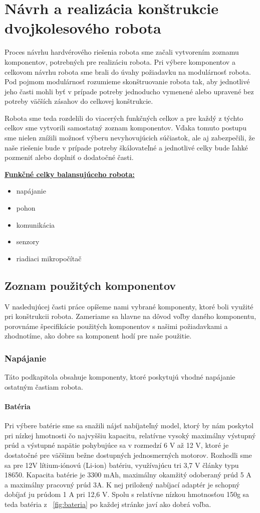 \chapter{Návrh a realizácia konštrukcie dvojkolesového robota}

Proces návrhu hardvérového riešenia robota sme začali vytvorením zoznamu komponentov, potrebných pre realizáciu robota. Pri výbere komponentov a celkovom návrhu robota sme brali do úvahy požiadavku na modulárnosť robota. Pod pojmom modulárnosť rozumieme skonštruovanie robota tak, aby jednotlivé jeho časti mohli byť v prípade potreby jednoducho vymenené alebo upravené bez potreby väčších zásahov do celkovej konštrukcie. 

Robota sme teda rozdelili do viacerých funkčných celkov a pre každý z týchto celkov sme vytvorili samostatný zoznam komponentov. Vďaka tomuto postupu sme nielen znížili možnosť výberu nevyhovujúcich súčiastok, ale aj zabezpečili, že naše riešenie bude v prípade potreby škálovateľné a jednotlivé celky bude ľahké pozmeniť alebo doplniť o dodatočné časti. 


\underline{\textbf{Funkčné celky balansujúceho robota:}}
\begin{itemize}
\item napájanie
\item pohon
\item komunikácia
\item senzory
\item riadiaci mikropočítač
\end{itemize}

\section{Zoznam použitých komponentov}

V nasledujúcej časti práce opíšeme nami vybrané komponenty, ktoré boli využité pri konštrukcii robota. Zameriame sa hlavne na dôvod voľby daného komponentu, porovnáme špecifikácie použitých komponentov s našimi požiadavkami a zhodnotíme, ako dobre sa komponent hodí pre naše použitie.


\subsection{Napájanie}
Táto podkapitola obsahuje komponenty, ktoré poskytujú vhodné napájanie ostatným častiam robota.
\subsubsection{Batéria}
Pri výbere batérie sme sa snažili nájsť nabíjateľný model, ktorý by nám poskytol pri nízkej hmotnosti čo najvyššiu kapacitu, relatívne vysoký maximálny výstupný prúd a  výstupné napätie pohybujúce sa v rozmedzí 6 V až 12 V, ktoré je dostatočné pre väčšinu bežne dostupných jednosmerných motorov. Rozhodli sme sa pre 12V lítium-iónovú (Li-ion) batériu, využívajúcu tri 3,7 V články typu 18650. Kapacita batérie je 3300 mAh, maximálny okamžitý odoberaný prúd 5 A a maximálny pracovný prúd 3A. K nej priložený nabíjací adaptér je schopný dobíjať ju prúdom 1 A pri 12,6 V. Spolu s relatívne nízkou hmotnosťou 150g sa teda batéria z \figurename~\ref{fig:bateria} po každej stránke javí ako dobrá voľba. 

